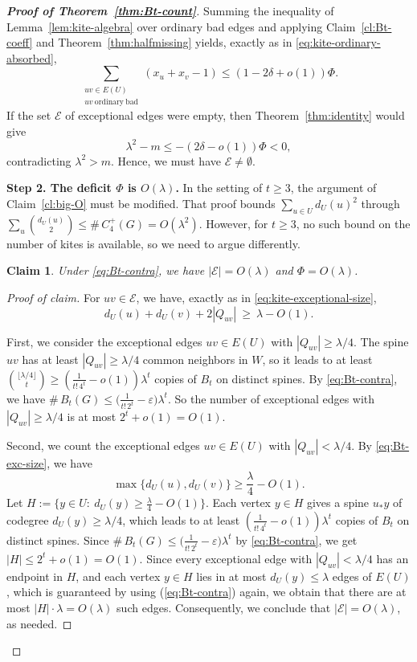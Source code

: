 \documentclass[11pt,a4paper]{article}
\newtheorem{claim}[theorem]{Claim}
\theoremstyle{definition}
\theoremstyle{plain}
\renewcommand{\le}{\leqslant}
\renewcommand{\ge}{\geqslant}
\begin{document}
\begin{proof}[{\bf Proof of Theorem~\ref{thm:Bt-count}}]
Summing the inequality of Lemma~\ref{lem:kite-algebra} over ordinary bad edges
and applying Claim~\ref{cl:Bt-coeff} and Theorem~\ref{thm:halfmissing} yields,
exactly as in \eqref{eq:kite-ordinary-absorbed},
\begin{equation}\label{eq:Bt-ordinary}
   \sum_{\substack{uv\in E(U)\\ uv\ \mathrm{ordinary\ bad}}}(x_u+x_v-1)
   \le(1-2\delta+o(1))\Phi .
\end{equation}
If the set $\mathcal E$ of exceptional edges were empty, then
Theorem~\ref{thm:identity} would give
$$\lambda^2-m\le-(2\delta-o(1))\Phi < 0, $$  contradicting $\lambda^2>m$.  Hence, we must have 
$\mathcal E\neq\emptyset$.

\medskip
\noindent\textbf{Step 2. The deficit $\Phi$ is $O(\lambda)$.}
In the setting of $t\ge 3$, the argument of Claim~\ref{cl:big-O} must be modified.  
That proof bounds 
$\sum_{u\in U}d_U(u)^2$ through $\sum_u\binom{d_U(u)}{2}\le
\texttt{\#}\,C_4^+(G)=O(\lambda^2)$. However, for $t\ge3$,  no such bound on the number of
kites is available, so we need to argue differently.

\begin{claim}\label{cl:Bt-deficit}
Under \eqref{eq:Bt-contra}, we have $|\mathcal E|=O(\lambda)$ and $\Phi=O(\lambda)$.
\end{claim}

\begin{proof}[Proof of claim]
For $uv\in\mathcal E$, we have, exactly as in \eqref{eq:kite-exceptional-size},
\begin{equation}\label{eq:Bt-exc-size}
   d_U(u)+d_U(v)+2|Q_{uv}|\ \ge\ \lambda-O(1).
\end{equation}


First, we 
consider the {exceptional edges $uv\in E(U)$ with $|Q_{uv}|\ge\lambda/4$.}  
The spine $uv$ has
 at least $|Q_{uv}|\ge\lambda/4$ common neighbors in $W$, so it leads to at least
$\binom{\lfloor\lambda/4\rfloor}{t}\ge(\tfrac1{t!\,4^t}-o(1))\lambda^t$ copies
of $B_t$ on distinct spines. By \eqref{eq:Bt-contra}, we have $\texttt{\#}\,B_t(G)\le\bigl(\frac{1}{t!\,2^{t}}-\varepsilon\bigr)\lambda^{t}$. So the number of exceptional edges with $|Q_{uv}| \ge \lambda /4$ is at most
$ 2^t + o(1)= O(1)$. 

Second, we count the exceptional edges $uv\in E(U)$ with $|Q_{uv}|<\lambda/4$.  
By \eqref{eq:Bt-exc-size}, we have 
$$ \max\{d_U(u),d_U(v)\}\ge \frac\lambda4-O(1).$$ 
Let
$H:=\{y\in U:\ d_U(y)\ge\tfrac\lambda4-O(1)\}$.  Each vertex $y\in H$ gives a spine
$u_*y$ of codegree $d_U(y)\ge\lambda/4$, which leads to at least
$(\tfrac1{t!\,4^t}-o(1))\lambda^t$ copies of $B_t$ on distinct spines. Since  $\texttt{\#}\,B_t(G)\le\bigl(\frac{1}{t!\,2^{t}}-\varepsilon\bigr)\lambda^{t}$ by \eqref{eq:Bt-contra}, we get 
$|H|\le2^t+o(1)=O(1)$. 
Since every exceptional edge with $|Q_{uv}|<\lambda/4$
has an endpoint in $H$, and each vertex $y\in H$ lies in at most $d_U(y)\le\lambda$
edges of $E(U)$, which is guaranteed by using (\ref{eq:Bt-contra}) again, we obtain that there are at most $|H|\cdot\lambda=O(\lambda)$ such edges.
Consequently, we conclude that $|\mathcal E|=O(\lambda)$, as needed. 


\end{proof}
\end{proof}
\end{document}
